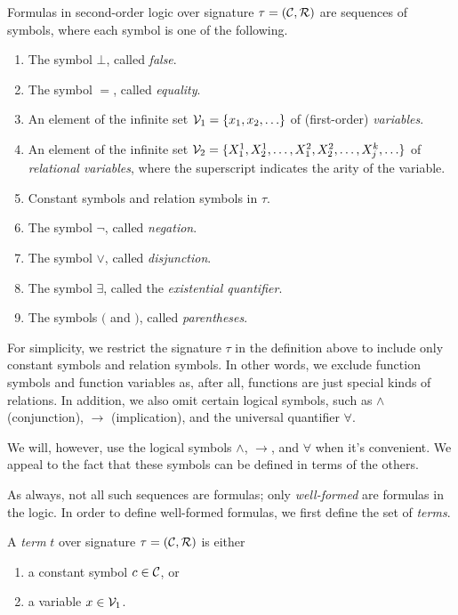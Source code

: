 \documentclass[11pt,twoside=off,numbers=noenddot]{scrbook}
\begin{document}
Formulas in second-order logic over signature $\tau = (\mathcal{C}, \mathcal{R})$ are sequences of symbols, where each symbol is one of the following.
\begin{enumerate}
  \item The symbol $\bot$, called \emph{false}.
  \item The symbol $=$, called \emph{equality}.
  \item An element of the infinite set $\vars_1 = \set{x_1, x_2, \dots}$ of (first-order) \emph{variables}.
  \item An element of the infinite set $\vars_2 = \set{X_1^1, X_2^1, \dots, X_1^2, X_2^2, \dots, X_j^k, \dots}$ of \emph{relational variables}, where the superscript indicates the arity of the variable.
  \item Constant symbols and relation symbols in $\tau$.
  \item The symbol $\neg$, called \emph{negation}.
  \item The symbol $\vee$, called \emph{disjunction}.
  \item The symbol $\exists$, called the \emph{existential quantifier}.
  \item The symbols $($ and $)$, called \emph{parentheses}.
\end{enumerate}

\begin{remark}
  For simplicity, we restrict the signature $\tau$ in the definition above to include only constant symbols and relation symbols. In other words, we exclude function symbols and function variables as, after all, functions are just special kinds of relations. In addition, we also omit certain logical symbols, such as $\wedge$ (conjunction), $\rightarrow$ (implication), and the universal quantifier $\forall$.
\end{remark}

\begin{abuse}
  We will, however, use the logical symbols $\wedge$, $\rightarrow$, and $\forall$ when it's convenient. We appeal to the fact that these symbols can be defined in terms of the others.
\end{abuse}

As always, not all such sequences are formulas; only \emph{well-formed} are formulas in the logic. In order to define well-formed formulas, we first define the set of \emph{terms}.

\begin{definition}
  A \emph{term} $t$ over signature $\tau = (\mathcal{C}, \mathcal{R})$ is either
  \begin{enumerate}
    \item a constant symbol $c \in \mathcal{C}$, or
    \item a variable $x \in \mathcal{V}_1$.
  \end{enumerate}
\end{definition}
\end{document}
